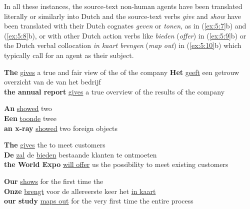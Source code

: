 \documentclass[output=paper]{LSP/langsci}
\begin{document}
In all these instances, the source-text non-human agents have been translated literally or similarly into Dutch and the source-text verbs \textit{give} and \textit{show} have been translated with their Dutch cognates \textit{geven} or \textit{tonen}, as in (\ref{ex:5:7}b) and (\ref{ex:5:8}b), or with other Dutch action verbs like \textit{bieden} (\textit{offer}) in (\ref{ex:5:9}b) or the Dutch verbal collocation \textit{in kaart brengen} (\textit{map out}) in (\ref{ex:5:10}b) which typically call for an agent as their subject.      

\ea \label{ex:5:7}
\ea
\textbf{The}  \ul{gives} a true and fair view of the  of the company
\ex
\textbf{Het}  \ul{geeft} een getrouw overzicht van de  van het bedrijf\\
\textbf{the annual report} \ul{gives} a true overview of the results of the company
\z
\z



\ea \label{ex:5:8}
\ea
\textbf{An}  \ul{showed} two \\[1em]
\ex \textbf{Een}  \ul{toonde} twee \\
\textbf{an x-ray} \ul{showed} two foreign objects
\z
\z




\ea \label{ex:5:9} 
\ea
\textbf{The}  \ul{gives}  the  to meet customers\\[1em]
\ex
\textbf{De}  \ul{zal}  de  \ul{bieden} bestaande klanten te ontmoeten\\
\textbf{the World Expo} \ul{will offer} us the possibility to meet existing customers
\z
\z


\ea \label{ex:5:10}
\ea
\textbf{Our}  \ul{shows} for the first time the \\[1em]
\ex
\textbf{Onze}  \ul{brengt} voor de allereerste keer het  \ul{in kaart}\\
\textbf{our study} \ul{maps out} for the very first time the entire process
\z
\z
\end{document}
